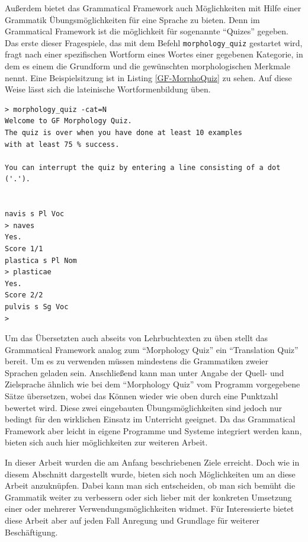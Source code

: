 Außerdem bietet das Grammatical Framework auch Möglichkeiten mit Hilfe einer Grammatik Übungsmöglichkeiten für eine Sprache zu bieten. Denn im Grammatical Framework ist die möglichkeit für sogenannte ``Quizes'' gegeben. Das erste dieser Fragespiele, das mit dem Befehl \texttt{morphology\_quiz} gestartet wird, fragt nach einer spezifischen Wortform eines Wortes einer gegebenen Kategorie, in dem es einem die Grundform und die gewünschten morphologischen Merkmale nennt. Eine Beispielsitzung ist in Listing \ref{GF-MorphoQuiz} zu sehen. Auf diese Weise lässt sich die lateinische Wortformenbildung üben.
\begin{lstlisting}[float=ht,caption={Eine Beispielsitzung des Grammatical Framework Morphology Quiz},label={GF-MorphoQuiz}]
> morphology_quiz -cat=N
Welcome to GF Morphology Quiz.
The quiz is over when you have done at least 10 examples
with at least 75 % success.

You can interrupt the quiz by entering a line consisting of a dot ('.').


navis s Pl Voc
> naves
Yes.
Score 1/1
plastica s Pl Nom
> plasticae
Yes.
Score 2/2
pulvis s Sg Voc
>
\end{lstlisting}
Um das Übersetzten auch abseits von Lehrbuchtexten zu üben stellt das Grammatical Framework analog zum ``Morphology Quiz'' ein ``Translation Quiz'' bereit. Um es zu verwenden müssen mindestens die Grammatiken zweier Sprachen geladen sein. Anschließend kann man unter Angabe der Quell- und Zielsprache ähnlich wie bei dem ``Morphology Quiz'' vom Programm vorgegebene Sätze übersetzen, wobei das Können wieder wie oben durch eine Punktzahl bewertet wird. Diese zwei eingebauten Übungsmöglichkeiten sind jedoch nur bedingt für den wirklichen Einsatz im Unterricht geeignet. Da das Grammatical Framework aber leicht in eigene Programme und Systeme integriert werden kann, bieten sich auch hier möglichkeiten zur weiteren Arbeit.\par
In dieser Arbeit wurden die am Anfang beschriebenen Ziele erreicht. Doch wie in diesem Abschnitt dargestellt wurde, bieten sich noch Möglichkeiten um an diese Arbeit anzuknüpfen. Dabei kann man sich entscheiden, ob man sich bemüht die Grammatik weiter zu verbessern oder sich lieber mit der konkreten Umsetzung einer oder mehrerer Verwendungsmöglichkeiten widmet. Für Interessierte bietet diese Arbeit aber auf jeden Fall Anregung und Grundlage für weiterer Beschäftigung.